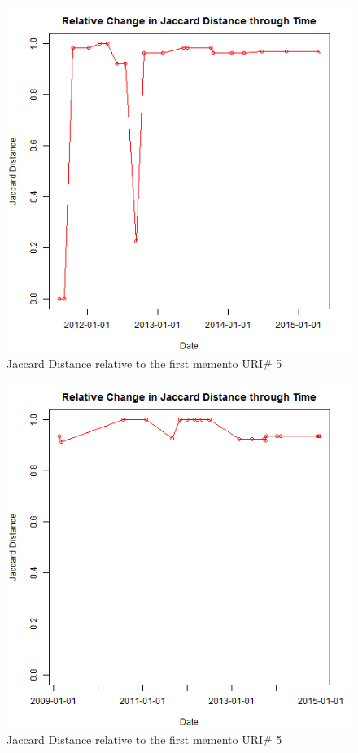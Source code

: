 \begin{figure}[ht]
	\begin{center}
		 \includegraphics[scale=0.60]{url5}
		  \caption{Jaccard Distance relative to the first memento URI\# 5}
	 \end{center}
\end{figure}
\begin{figure}[ht]
	\begin{center}
		 \includegraphics[scale=0.60]{url6}
		  \caption{Jaccard Distance relative to the first memento URI\# 5}
	 \end{center}
\end{figure}
